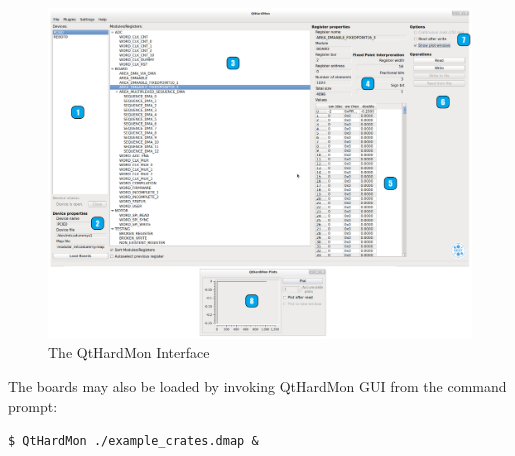 \begin{figure}[htbp] 
    \centering
    \includegraphics[width=1\textwidth]{images/GUI_interface.png} \caption{The
    QtHardMon Interface} \label{qthardmon_interface} \end{figure}

The boards may also be loaded by invoking QtHardMon GUI from the command prompt:
\\\centerline{\texttt{\$ QtHardMon ./example\_crates.dmap \&}} \\\\


